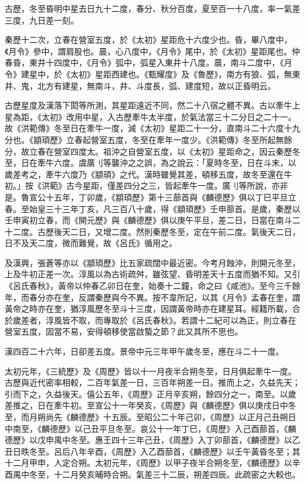 \begin{pinyinscope}
 古歷，冬至昏明中星去日九十二度，春分、秋分百度，夏至百一十八度，率一氣差三度，九日差一刻。



 秦歷十二次，立春在營室五度，於《太初》星距危十六度少也。昏，畢八度中，《月令》參中，謂肩股也。晨，心八度中，《月令》尾中，於《太初》星距尾也。仲春昏，東井十四度中，《月令》弧中，弧星入東井十八度。晨，南斗二度中，《月令》建星中，於《太初》星距西建也。《甄耀度》及《魯歷》，南方有狼、弧，無東井、鬼，北方有建星，無南斗，井、斗度長，弧、建度短，故以正昏明云。



 古歷星度及漢落下閎等所測，其星距遠近不同，然二十八宿之體不異。古以牽牛上星為距，《太初》改用中星，入古歷牽牛太半度，於氣法當三十二分日之二十一。故《洪範傳》冬至日在牽牛一度，減《太初》星距二十一分，直南斗二十六度十九分也。《顓頊歷》立春起營室五度，冬至在牽年一度少。《洪範傳》冬至所起無餘分，故立春在營室四度太。祖沖之自營室五度，以《太初》星距命之，因云秦歷冬至，日在牽牛六度。虞廣刂等襲沖之之誤，為之說云：「夏時冬至，日在斗末，以歲差考之，牽牛六度乃《顓頊》之代。漢時雖覺其差，頓移五度，故冬至還在牛初。」按《洪範》古今星距，僅差四分之三，皆起牽牛一度。廣刂等所說，亦非是。魯宣公十五年，丁卯歲，《顓頊歷》第十三蔀首與《麟德歷》俱以丁巳平旦立春。至始皇三十三年丁亥，凡三百八十歲，得《顓頊歷》壬申蔀首。是歲，秦歷以壬申寅初立春，而《開元歷》與《麟德歷》俱以庚午平旦，差二日，日當在南斗二十二度。古歷後天二日，又增二度。然則秦歷冬至，定在午前二度。氣後天二日，日不及天二度，微而難覺，故《呂氏》循用之。



 及漢興，張蒼等亦以《顓頊歷》比五家疏闊中最近密。今考月蝕沖，則開元冬至，上及牛初正差一次。淳風以為古術疏舛，雖弦望、昏明差天十五度而猶不知。又引《呂氏春秋》，黃帝以仲春乙卯日在奎，始奏十二鐘，命之曰《咸池》。至今三千餘年，而春分亦在奎，反謂秦歷與今不異。按不韋所記，以其《月令》孟春在奎，謂黃帝之時亦在奎，猶淳風歷冬至斗十三度，因謂黃帝時亦在建星耳。經籍所載，合於歲差者，淳風皆不取，而專取於《呂氏春秋》。若謂十二紀可以為正，則立春在營室五度，固當不易，安得頓移使當啟蟄之節？此又其所不思也。



 漢四百二十六年，日卻差五度。景帝中元三年甲午歲冬至，應在斗二十一度。



 太初元年，《三統歷》及《周歷》皆以十一月夜半合朔冬至，日月俱起牽牛一度。古歷與近代密率相較，二百年氣差一日，三百年朔差一日。推而上之，久益先天；引而下之，久益後天。僖公五年，《周歷》正月辛亥朔，餘四分之一，南至。以歲差推之，日在牽牛初。至宣公十一年癸亥，《周歷》與《麟德歷》俱以庚戌日中冬至，而月朔尚先《麟德歷》十五辰。至昭公二十年己卯，《周歷》以正月己丑朔日中南至，《麟德歷》以己丑平旦冬至。哀公十一年丁巳，《周歷》入己酉蔀首，《麟德歷》以戊申禺中冬至。惠王四十三年己丑，《周歷》入丁卯蔀首，《麟德歷》以乙丑日昳冬至。呂后八年辛酉，《周歷》入乙酉蔀首，《麟德歷》以壬午黃昏冬至；其十二月甲申，人定合朔。太初元年，《周歷》以甲子夜半合朔冬至，《麟德歷》以辛酉禺中冬至，十二月癸亥晡時合朔。氣差三十二辰，朔差四辰。此疏密之大較也。




\end{pinyinscope}
